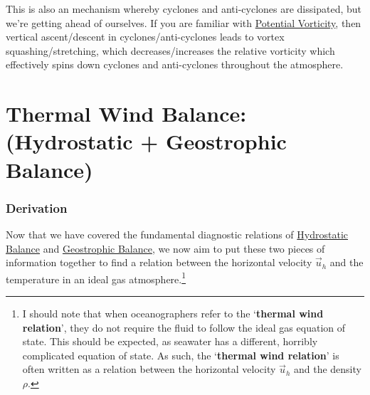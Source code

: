 This is also an mechanism whereby cyclones and anti-cyclones are dissipated, but we're getting ahead of ourselves. If you are familiar with \hyperref[PV]{Potential Vorticity}, then vertical ascent/descent in cyclones/anti-cyclones leads to vortex squashing/stretching, which decreases/increases the relative vorticity which effectively spins down cyclones and anti-cyclones throughout the atmosphere.

\section{Thermal Wind Balance: (Hydrostatic + Geostrophic Balance)}\label{s Thermal Wind}

\subsubsection{Derivation}

Now that we have covered the fundamental diagnostic relations of \hyperref[Hydrostatic GFD Box]{Hydrostatic Balance} and \hyperref[Geostrophic Box]{Geostrophic Balance}, we now aim to put these two pieces of information together to find a relation between the horizontal velocity \(\vec{u}_h\) and the temperature in an ideal gas atmosphere.\footnote{
    I should note that when oceanographers refer to the `\textbf{thermal wind relation}', they do not require the fluid to follow the ideal gas equation of state. This should be expected, as seawater has a different, horribly complicated equation of state. As such, the `\textbf{thermal wind relation}' is often written as a relation between the horizontal velocity \(\vec{u}_h\) and the density \(\rho\).
}

